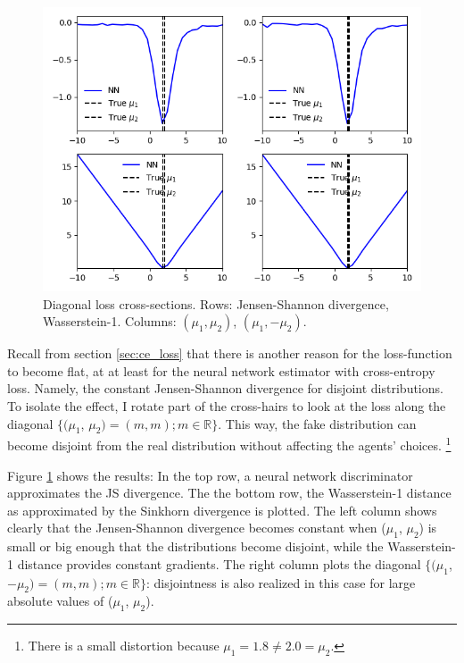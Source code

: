 \begin{figure}
    \includegraphics[width=\textwidth]{./Images/diagonal_loss_plots CE wasserstein-1.png} %
    \caption{Diagonal loss cross-sections. Rows: Jensen-Shannon divergence, Wasserstein-1. Columns: $(\mu_1, \mu_2)$, $(\mu_1, -\mu_2)$.}
    \label{fig:diagonal_loss_plots}
\end{figure}

Recall from section \ref{sec:ce_loss} that there is another reason for the loss-function to become flat,
at at least for the neural network estimator with cross-entropy loss.
Namely, the constant Jensen-Shannon divergence for disjoint distributions.
To isolate the effect, I rotate part of the cross-hairs to look at the loss along the diagonal $\{(\mu_1$, $\mu_2) = (m, m); m \in \mathbb{R}\}$.
This way, the fake distribution can become disjoint from the real distribution without affecting the agents' choices.
\footnote{There is a small distortion because $\mu_1 = 1.8 \neq 2.0 = \mu_2$.}

Figure \ref{fig:diagonal_loss_plots} shows the results:
In the top row, a neural network discriminator approximates the JS divergence.
The the bottom row, the Wasserstein-1 distance as approximated by the Sinkhorn divergence is plotted.
The left column shows clearly that the Jensen-Shannon divergence becomes constant when ($\mu_1$, $\mu_2$) is small or big enough that the distributions become disjoint, while the Wasserstein-1 distance provides constant gradients.
The right column plots the diagonal $\{(\mu_1$, $-\mu_2) = (m, m); m \in \mathbb{R}\}$: disjointness is also realized in this case for large absolute values of ($\mu_1$, $\mu_2$).

